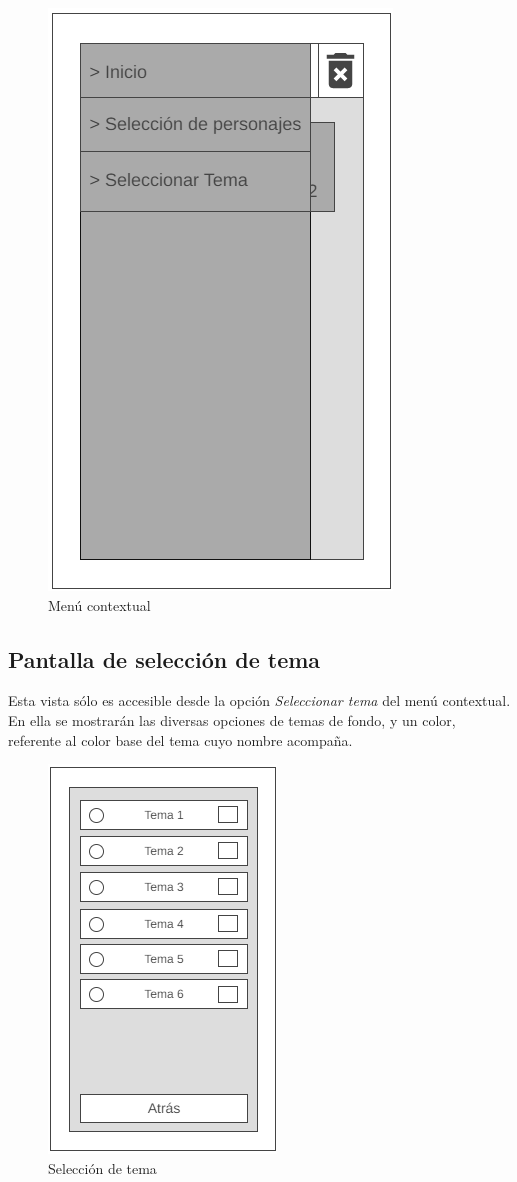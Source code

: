\begin{figure}[H]
    \centering
    \includegraphics[scale=0.4]{Figures/Mockups/Mock_Menu.png}
    \caption{Menú contextual}
    \label{MenuContextual}    
\end{figure}

\subsection{Pantalla de selección de tema}
Esta vista sólo es accesible desde la opción \textit{Seleccionar tema} del menú contextual.
En ella se mostrarán las diversas opciones de temas de fondo, y un color, referente al color base del tema cuyo nombre acompaña.

\begin{figure}[H]
    \centering
    \includegraphics[scale=0.5]{Figures/Mockups/Mock_SeleccionTema.png}
    \caption{Selección de tema}
    \label{SeleccionTema}    
\end{figure}
\newpage
